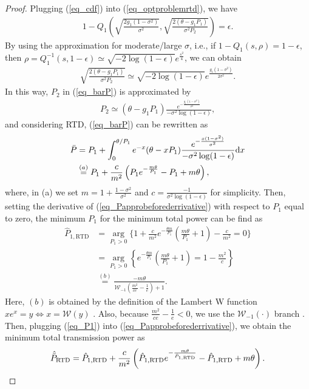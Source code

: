 \begin{proof}
Plugging (\ref{eq_cdf}) into (\ref{eq_optproblemrtd}), we have
\begin{align}
    1-Q_1\left(\sqrt{\frac{2g_1(1-\sigma^2)}{\sigma^2}},\sqrt{\frac{2(\theta-g_1P_1)}{\sigma^2 P_2}}\right) = \epsilon.
\end{align}
By using the approximation \cite[Eq. 17]{Azari2018TCultra} for moderate/large $\sigma$, i.e., if $1-Q_1(s,\rho) = 1-\epsilon$, then $\rho = Q_1^{-1}(s, 1-\epsilon) \simeq \sqrt{-2\log(1-\epsilon)}e^{\frac{s^2}{4}}$, we can obtain 
\begin{align}
    \sqrt{\frac{2(\theta-g_1P_1)}{\sigma^2 P_2}}\simeq \sqrt{-2\log(1-\epsilon)}e^{\frac{g_1(1-\sigma^2)}{2\sigma^2}}.
\end{align}
In this way, $P_2$ in (\ref{eq_barP}) is approximated by
\begin{align}
    P_2 \simeq (\theta - g_1P_1)\frac{e^{-\frac{g_1(1-\sigma^2)}{\sigma^2}}}{-\sigma^2\log(1-\epsilon)},
\end{align}
and considering RTD, (\ref{eq_barP}) can be rewritten as
\begin{align}\label{eq_Papprobeforederrivative}
    \Bar{P} &= P_1 + \int_0^{\theta/P_1} e^{- x}(\theta - xP_1)\frac{e^{-\frac{x(1-\sigma^2)}{\sigma^2}}}{-\sigma^2\log(1-\epsilon)}\text{d}x \nonumber\\
    &\overset{(a)}{=} P_1 + \frac{c}{m^2}\left(P_1 e^{-\frac{m\theta}{P_1}}-P_1 + m\theta\right),
\end{align}
where, in (a) we set $m = 1 + \frac{1-\sigma^2}{\sigma^2}$ and $c = \frac{-1}{\sigma^2\log(1-\epsilon)}$ for simplicity. Then, setting the derivative of (\ref{eq_Papprobeforederrivative})  with respect to $P_1$ equal to zero, the minimum $P_1$ for the minimum total power can be find as
\begin{align}
  \label{eq_P1}
    \hat{P}_{1,\text{RTD}} & = \operatorname*{arg}_{P_1 > 0} \Bigg\{ 1 +  \frac{c}{m^2}e^{-\frac{\theta m}{P_1}}\left(\frac{m\theta}{P_1}+1\right) - \frac{c}{m^2} = 0\Bigg\}\nonumber\\
    & = \operatorname*{arg}_{P_1 > 0} \left\{e^{-\frac{\theta m}{P_1}}\left(\frac{m\theta}{P_1}+1\right) = 1-\frac{m^2}{c} \right\}\nonumber\\
    & \overset{(b)}= \frac{-m\theta}{\mathcal{W}_{-1}\left(\frac{m^2}{ce}-\frac{1}{e}\right)+1}.
\end{align}
Here, $(b)$ is obtained by the definition of the Lambert W function $xe^x = y \Leftrightarrow x = \mathcal{W}(y)$ \cite{corless1996lambertw}. Also, because $\frac{m^2}{ce}-\frac{1}{e}<0$, we use the $\mathcal{W}_{-1}(\cdot)$ branch \cite[Eq. 16]{veberic2010having}. Then, plugging (\ref{eq_P1}) into (\ref{eq_Papprobeforederrivative}), we obtain the  minimum total transmission power as
\begin{align}\label{eq_666666}
    \hat{\Bar{P}}_{\text{RTD}} =\hat{P}_{1,\text{RTD}} + \frac{c}{m^2}\left(\hat{P}_{1,\text{RTD}} e^{-\frac{m\theta}{\hat{P}_{1,\text{RTD}}}}-\hat{P}_{1,\text{RTD}} + m\theta\right).
\end{align}
\end{proof}


